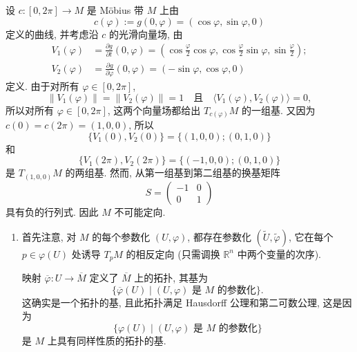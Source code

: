 \begin{description}[font=\normalfont,leftmargin=2em,labelwidth=1.5em]
设 $c:[0,2\pi]\to M$ 是 Möbius 带 $M$ 上由
\[
  c(\varphi):=g(0,\varphi)=(\cos\varphi,\sin\varphi,0)
\]
定义的曲线, 并考虑沿 $c$ 的光滑向量场, 由
\begin{align*}
  V_1(\varphi)&=\frac{\partial g}{\partial t}(0,\varphi)
  =\left(\cos\frac{\varphi}{2}\cos\varphi,\cos\frac{\varphi}{2}\sin\varphi,\sin\frac{\varphi}{2}\right);\\
  V_2(\varphi)&=\frac{\partial g}{\partial\varphi}(0,\varphi)=(-\sin\varphi,\cos\varphi,0)
\end{align*}
定义. 由于对所有 $\varphi\in[0,2\pi]$,
\[
  \lVert V_1(\varphi)\rVert=\lVert V_2(\varphi)\rVert=1
  \quad\text{且}\quad\langle V_1(\varphi),V_2(\varphi)\rangle=0,
\]
所以对所有 $\varphi\in[0,2\pi]$, 这两个向量场都给出 $T_{c(\varphi)}M$ 的一组基. 又因为 $c(0)=c(2\pi)=(1,0,0)$, 所以
\[
  \{V_1(0),V_2(0)\}=\{(1,0,0);(0,1,0)\}
\]
和
\[
  \{V_1(2\pi),V_2(2\pi)\}=\{(-1,0,0);(0,1,0)\}
\]
是 $T_{(1,0,0)}M$ 的两组基. 然而, 从第一组基到第二组基的换基矩阵
\[
  S=\begin{pmatrix}-1&0\\0&1\end{pmatrix}
\]
具有负的行列式. 因此 $M$ 不可能定向.

\begin{enumerate}[label=(\alph*),ref=\alph*,leftmargin=*]
\item 首先注意, 对 $M$ 的每个参数化 $(U,\varphi)$, 都存在参数化 $(\widetilde U,\widetilde\varphi)$, 它在每个 $p\in\varphi(U)$ 处诱导 $T_pM$ 的相反定向 (只需调换 $\mathbb{R}^n$ 中两个变量的次序).

映射 $\overline{\varphi}:U\to\overline M$ 定义了 $\overline M$ 上的拓扑, 其基为
\[
  \{\overline{\varphi}(U)\mid (U,\varphi)\text{ 是 }M\text{ 的参数化}\}.
\]
这确实是一个拓扑的基, 且此拓扑满足 Hausdorff 公理和第二可数公理, 这是因为
\[
  \{\varphi(U)\mid (U,\varphi)\text{ 是 }M\text{ 的参数化}\}
\]
是 $M$ 上具有同样性质的拓扑的基.


\end{enumerate}
\end{description}
